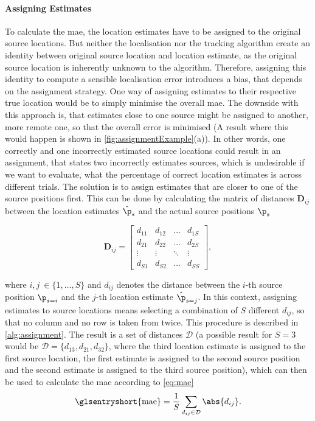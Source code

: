 \paragraph{Assigning Estimates} To calculate the \gls{mae}, the location estimates have to be assigned to the original source locations. But neither the localisation nor the tracking algorithm create an identity between original source location and location estimate, as the original source location is inherently unknown to the algorithm. Therefore, assigning this identity to compute a sensible localisation error introduces a bias, that depends on the assignment strategy. One way of assigning estimates to their respective true location would be to simply minimise the overall \gls{mae}. The downside with this approach is, that estimates close to one source might be assigned to another, more remote one, so that the overall error is minimised (A result where this would happen is shown in \autoref{fig:assignmentExample}(a)). In other words, one correctly and one incorrectly estimated source locations could result in an assignment, that states two incorrectly estimates sources, which is undesirable if we want to evaluate, what the percentage of correct location estimates is across different trials. The solution is to assign estimates that are closer to one of the source positions first. This can be done by calculating the matrix of distances $\bm{D}_{ij}$ between the location estimates $\hat\p_s$ and the actual source positions $\p_s$

\begin{equation}
	\bm{D}_{ij}=
	\begin{bmatrix}
		d_{11} & d_{12} & \dots  & d_{1S} \\
		d_{21} & d_{22} & \dots  & d_{2S}        \\
		\vdots   & \vdots   & \ddots & \vdots   \\
		d_{S1} & d_{S2}        & \dots  & d_{SS}
	\end{bmatrix},
\end{equation}

where $i,j\ \in \{1,\dots,S\}$ and $d_{ij}$ denotes the distance between the $i$-th source position $\p_{s=i}$ and the $j$-th location estimate $\hat\p_{s=j}$. In this context, assigning estimates to source locations means selecting a combination of $S$ different $d_{ij}$, so that no column and no row is taken from twice. This procedure is described in \autoref{alg:assignment}. The result is a set of distances $\mathcal{D}$ (a possible result for $S=3$ would be $\mathcal{D}=\{d_{13}, d_{21}, d_{32}\}$, where the third location estimate is assigned to the first source location, the first estimate is assigned to the second source position and the second estimate is assigned to the third source position), which can then be used to calculate the \gls{mae} according to \eqref{eq:mae}
\begin{equation}
    \text{\glsentryshort{mae}}=\frac{1}{S}\sum_{d_{ij}\in\mathcal{D}}\abs{d_{ij}}.
    \label{eq:mae}
\end{equation}

